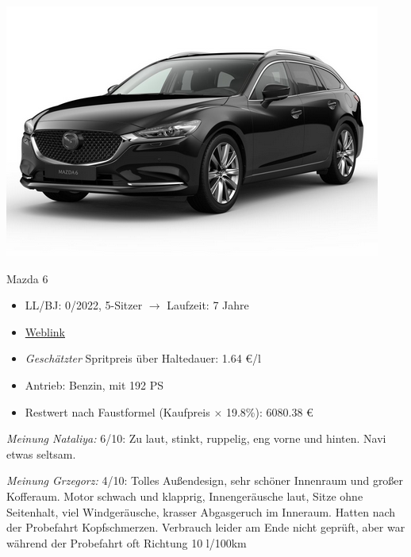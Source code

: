 \documentclass[landscape, DIV=99, 14pt]{scrartcl}
\begin{document}
\pagebreak
\begin{center}
\includegraphics[width=0.9\columnwidth]{cars/mazda-6-neu.png}

Mazda 6
\end{center}

\begin{itemize}
    \item LL/BJ: 0/2022, 5-Sitzer $\rightarrow$ Laufzeit: 7 Jahre
    \item \href{https://konfigurator.meinauto.de/mazda/neuwagen/48-6/angebote/6-kombi/konfigurator/\#!/extras/exclusive-line/8846370/10,11/private/65352-5416-204698/984/61c9aa657e74c/cash-purchase/32545--287374/48,0,10000,0,0,0,0,0,}{Weblink}
    \item \emph{Gesch\"atzter} Spritpreis \"uber Haltedauer: 1.64 \euro{}/l
    \item Antrieb: Benzin, mit 192 PS
    \item Restwert nach Faustformel (Kaufpreis $\times$ 19.8\%): 6080.38 \euro{}
\end{itemize}

\begin{small}
\emph{Meinung Nataliya:} 6/10: Zu laut, stinkt, ruppelig, eng vorne und hinten. Navi etwas seltsam.
        
\emph{Meinung Grzegorz:} 4/10: Tolles Au\ss{}endesign, sehr sch\"oner Innenraum und gro\ss{}er Kofferaum. Motor schwach und klapprig, Innenger\"ausche laut, Sitze ohne Seitenhalt, viel Windger\"ausche, krasser Abgasgeruch im Inneraum. Hatten nach der Probefahrt Kopfschmerzen. Verbrauch leider am Ende nicht gepr\"uft, aber war w\"ahrend der Probefahrt oft Richtung 10 l/100km
\end{small}

\pagebreak
\end{document}
